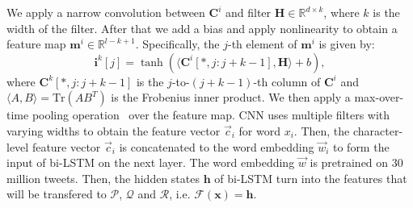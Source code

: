\documentclass[11pt,letterpaper]{article}
\begin{document}
We apply a narrow convolution between $\textbf{C}^i$ and filter $\textbf{H} \in \mathbb{R}^{d\times k}$, where $k$ is the width of the filter. After that we add a bias and apply nonlinearity to obtain a feature map $\textbf{m}^i \in \mathbb{R}^{l-k+1}$. Specifically, the $j$-th element of $\textbf{m}^i$ is given by:
\begin{equation}
\textbf{i}^k[j] = \tanh(\langle\textbf{C}^i[*,j:j+k-1],\textbf{H}\rangle+b),
\end{equation}
where $\textbf{C}^k[*,j:j+k-1]$ is the $j$-to-$(j+k-1)$-th column of $\textbf{C}^i$ and $\langle A,B \rangle=\mbox{Tr}(AB^T)$ is the Frobenius inner product. We then apply a max-over-time pooling operation~\cite{collobert2011natural} over the feature map. CNN uses multiple filters with varying widths to obtain the feature vector $\vec{c}_i$ for word $x_i$. Then, the character-level feature vector $\vec{c}_i$ is concatenated to the word embedding $\vec{w}_i$ to form the input of bi-LSTM on the next layer. The word embedding $\vec{w}$ is pretrained on 30 million tweets. Then, the hidden states $\textbf{h}$ of bi-LSTM turn into the features that will be transfered to $\mathcal{P}$, $\mathcal{Q}$ and $\mathcal{R}$, i.e. $\mathcal{F}(\textbf{x}) = \textbf{h}$.


\end{document}
